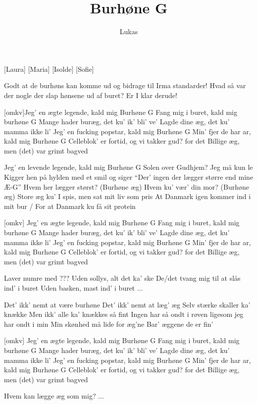 \documentclass[a4paper,11pt]{article}
\title{Burhøne G}
\author{Lukas}
\begin{document}
\maketitle

\begin{roles}
    [Laura]
 [Maria]
 [Isolde]
 [Sofie]
\end{roles}

\begin{sketch}
 Godt at de burhøns kan komme ud og bidrage til Irma standarder!
 Hvad så var der nogle der slap hønsene ud af buret? Er I klar derude!
\end{sketch}

\begin{song}

 [omkv]Jeg' en ægte legende, kald mig Burhøne G
Fang mig i buret, kald mig burhøne G
Mange hader buræg, det ku’ ik’ bli’ ve’
Lagde dine æg, det ku’ mamma ikke li’
Jeg’ en fucking popstar, kald mig Burhøne G
Min’ fjer de har ar, kald mig Burhøne G
Celleblok’ er fortid, og vi takker gud? for det
Billige æg, men (det) var grimt bagved

  Jeg’ en levende legende, kald mig Burhøne G
Solen over Gudhjem? Jeg må kun le
Kigger hen på hylden
med et smil og siger
“Der' ingen der lægger større end mine Æ-G”
Hvem her lægger størst? (Burhøne æg)
Hvem ku’ vær’ din mor? (Burhøne æg)
Store æg ku' I spis, men sat mit liv som pris
At Danmark igen kommer ind i mit bur / For at Danmark ku få sit protein

 [omkv] Jeg' en ægte legende, kald mig Burhøne G
Fang mig i buret, kald mig burhøne G
Mange hader buræg, det ku’ ik’ bli’ ve’
Lagde dine æg, det ku’ mamma ikke li’
Jeg’ en fucking popstar, kald mig Burhøne G
Min’ fjer de har ar, kald mig Burhøne G
Celleblok’ er fortid, og vi takker gud? for det
Billige æg, men (det) var grimt bagved

 Laver numre med ???
Uden sollys, alt det ka’ ske
De/det tvang mig til at slås ind’ i buret
Uden basken, mast ind’ i buret
...

  Det’ ikk’ nemt at være burhøne
Det’ ikk’ nemt at læg’ æg
Selv stærke skaller ka’ knække
Men ikk’ alle ka’ knækkes så fint
Ingen har så ondt i røven
ligesom jeg har ondt i min
Min skønhed må lide for æg’ne
Bar’ æggene de er fin’


 [omkv] Jeg' en ægte legende, kald mig Burhøne G
Fang mig i buret, kald mig burhøne G
Mange hader buræg, det ku’ ik’ bli’ ve’
Lagde dine æg, det ku’ mamma ikke li’
Jeg’ en fucking popstar, kald mig Burhøne G
Min’ fjer de har ar, kald mig Burhøne G
Celleblok’ er fortid, og vi takker gud? for det
Billige æg, men (det) var grimt bagved

Hvem kan lægge æg som mig?
...

\end{song}
\end{document}
